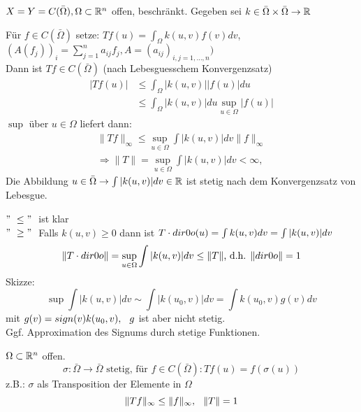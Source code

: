 \begin{beispiel}[Integraloperator] 
	$X = Y = C(\bar \Omega), \Omega \subset \mathbb{R}^{n}$ offen, beschränkt.
	Gegeben sei $k \in \bar \Omega \times \bar \Omega \rightarrow \mathbb{R} $
	
	Für $f \in C(\bar \Omega)$ setze: $Tf(u) = \int_{\Omega} k(u, v) f(v) dv$, \hspace{0.25cm}
	$\left( A( f_{j} ) \right)_{i} = \sum_{j = 1}^{n} a_{ij}f_{j}, A = (a_{ij})_{i,j = 1, \dotsc, n} )$ \\
	
	Dann ist $Tf \in C(\bar \Omega)$ (nach Lebesguesschem Konvergenzsatz)
	\begin{align*}
		|T f(u)| & \leq \int_{\Omega} |k(u, v)| |f(u)| du \\
				 & \leq \int_{\Omega} |k(u, v)| du \sup_{u \in \Omega} | f(u) |
	\end{align*} 				 
	$\sup$ über $u \in \Omega$ liefert dann:
	\begin{align*}
		\| Tf \|_{\infty} \leq \sup_{u \in \Omega} \int |k(u,v)| dv \| f \|_{\infty} \\
		\Rightarrow \| T \| = \sup_{u \in \Omega} \int |k(u, v)| dv < \infty,
	\end{align*} 	
	Die Abbildung $u \in \bar \Omega \rightarrow \int |k(u, v)| dv \in \mathbb{R}$ ist stetig nach dem Konvergenzsatz von Lebesgue. \\
	\begin{beweis}
		$ "\ \leq "\ $ ist klar \\
		$ "\ \geq "\ $ Falls $ k(u, v) \geq 0$ dann ist $T \cdot \1 (u) = \int k(u, v) dv = \int |k(u, v)| dv$ \\
		\[ \| T \cdot \1 \| = \sup_{u \in \Omega} \int |k(u, v)| dv \leq \| T \| \text{, d.h. } \| \1 \| = 1 \]
		Skizze:
		\[ \sup \int | k(u, v) | dv \sim \int | k(u_{0}, v) | dv = \int k(u_{0}, v) g(v) dv \]
		mit $g(v) = sign(v) k(u_{0}, v), \hspace{0.25cm} g$ ist aber nicht stetig. \\
		Ggf. Approximation des Signums durch stetige Funktionen.
	\end{beweis}
\end{beispiel}


\begin{beispiel}[Kompositionsoperator] 
$\Omega \subset \mathbb{R}^{n}$ offen. 
\[ \sigma \colon \bar \Omega \rightarrow \bar \Omega \text{ stetig, für } f \in C(\bar \Omega): Tf(u) = f(\sigma(u)) \]
z.B.: $\sigma$ als Transposition der Elemente in $\Omega$
\[ \| Tf \|_{\infty} \leq \| f \|_{\infty}, \hspace{0.25cm} \| T \| = 1 \]
\end{beispiel}

